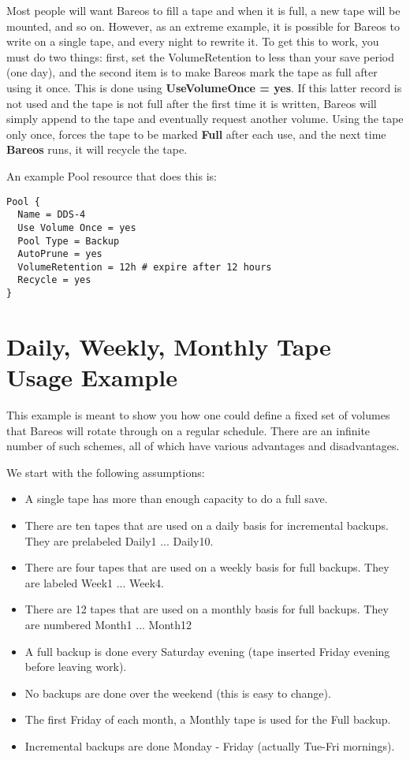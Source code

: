 Most people will want Bareos to fill a tape and when it is full, a new tape
will be mounted, and so on. However, as an extreme example, it is possible for
Bareos to write on a single tape, and every night to rewrite it. To get this
to work, you must do two things: first, set the VolumeRetention to less than
your save period (one day), and the second item is to make Bareos mark the
tape as full after using it once. This is done using {\bf UseVolumeOnce =
yes}. If this latter record is not used and the tape is not full after the
first time it is written, Bareos will simply append to the tape and eventually
request another volume. Using the tape only once, forces the tape to be marked
{\bf Full} after each use, and the next time {\bf Bareos} runs, it will
recycle the tape.

An example Pool resource that does this is:

\footnotesize
\begin{verbatim}
Pool {
  Name = DDS-4
  Use Volume Once = yes
  Pool Type = Backup
  AutoPrune = yes
  VolumeRetention = 12h # expire after 12 hours
  Recycle = yes
}
\end{verbatim}
\normalsize

\section{Daily, Weekly, Monthly Tape Usage Example}
\label{usageexample}

This example is meant to show you how one could define a fixed set of volumes
that Bareos will rotate through on a regular schedule. There are an infinite
number of such schemes, all of which have various advantages and
disadvantages.

We start with the following assumptions:

\begin{itemize}
\item A single tape has more than enough capacity to do  a full save.
\item There are ten tapes that are used on a daily basis  for incremental
   backups. They are prelabeled Daily1 ...  Daily10.
\item There are four tapes that are used on a weekly basis  for full backups.
   They are labeled Week1 ... Week4.
\item There are 12 tapes that are used on a monthly basis  for full backups.
   They are numbered Month1 ... Month12
\item A full backup is done every Saturday evening (tape inserted  Friday
   evening before leaving work).
\item No backups are done over the weekend (this is easy to  change).
\item The first Friday of each month, a Monthly tape is used for  the Full
   backup.
\item Incremental backups are done Monday - Friday (actually  Tue-Fri
   mornings).
   \end{itemize}

